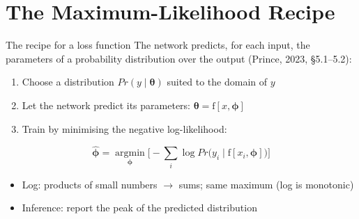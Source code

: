 \documentclass[aspectratio=169, 11pt]{beamer}
\begin{document}
\section{The Maximum-Likelihood Recipe}

\begin{frame}{The recipe for a loss function}
  The network predicts, for each input, the
  \alert{parameters of a probability distribution} over
  the output (Prince, 2023, \S5.1--5.2):
  \vspace{0.2em}
  \begin{enumerate}\setlength{\itemsep}{2pt}
    \item Choose a distribution
          $Pr(y\mid\bm\theta)$ suited to the
          \alert{domain of $y$}
    \item Let the network predict its parameters:
          $\bm\theta = \mathrm{f}[x,\bm\phi]$
    \item Train by minimising the
          \alert{negative log-likelihood}:
  \end{enumerate}
  \[
    \hat{\bm\phi} = \operatorname*{argmin}_{\bm\phi}
    \Big[-\sum_{i}
    \log Pr\big(y_i \mid \mathrm{f}[x_i,\bm\phi]\big)
    \Big]
  \]
  \begin{itemize}\setlength{\itemsep}{1pt}
    \item Log: products of small numbers $\to$ sums;
          same maximum (log is monotonic)
    \item Inference: report the \alert{peak} of the
          predicted distribution
  \end{itemize}
\end{frame}
\end{document}
